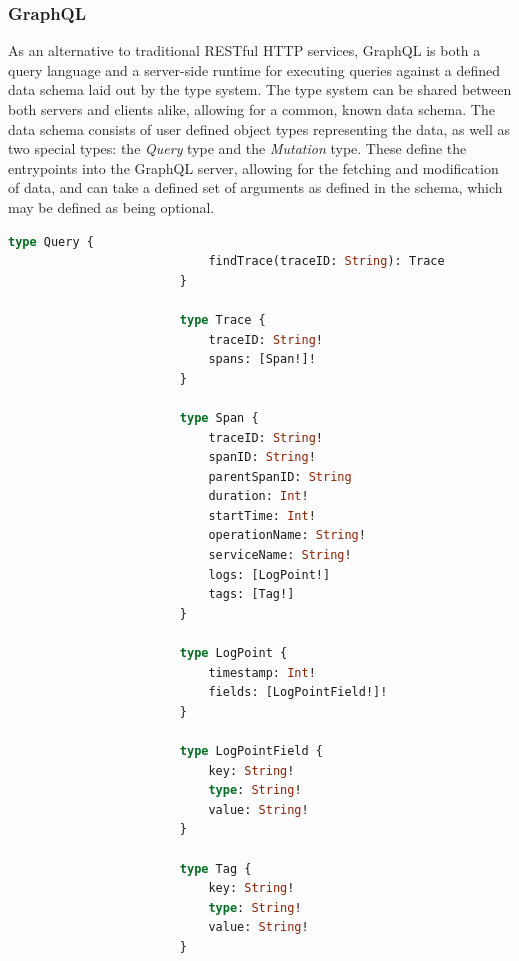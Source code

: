\documentclass[12pt,pdftex,titlepage]{report}
\begin{document}
                \subsubsection{GraphQL}
                    As an alternative to traditional RESTful HTTP services, GraphQL is both a query language and a server-side runtime for executing queries against a defined data schema
                    laid out by the type system. The type system can be shared between both servers and clients alike, allowing for a common, known data schema. The data schema consists of 
                    user defined object types representing the data, as well as two special types: the \textit{Query} type and the \textit{Mutation} type. These define the entrypoints into
                    the GraphQL server, allowing for the fetching and modification of data, and can take a defined set of arguments as defined in the schema, which may be defined as being
                    optional.

                    \bigskip
                    \begin{lstlisting}[caption={The base GraphQL schema, defining a query and data types for the trace data.}, language=GraphQL, gobble=24]
                        type Query {
                            findTrace(traceID: String): Trace
                        }

                        type Trace {
                            traceID: String!
                            spans: [Span!]!
                        }

                        type Span {
                            traceID: String!
                            spanID: String!
                            parentSpanID: String
                            duration: Int!
                            startTime: Int!
                            operationName: String!
                            serviceName: String!
                            logs: [LogPoint!]
                            tags: [Tag!]
                        }

                        type LogPoint {
                            timestamp: Int!
                            fields: [LogPointField!]!
                        }

                        type LogPointField {
                            key: String!
                            type: String!
                            value: String!
                        }

                        type Tag {
                            key: String!
                            type: String!
                            value: String!
                        }
                    \end{lstlisting}
                    \bigskip
                    
\end{document}
